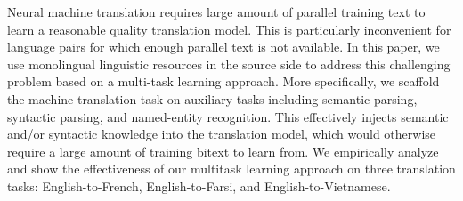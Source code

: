 Neural machine translation requires large amount of parallel training text to learn a reasonable quality translation model. This is particularly inconvenient for language pairs for which enough parallel text is not available. In this paper, we use monolingual linguistic resources in the source side to address this challenging problem based on a multi-task learning approach. More specifically, we scaffold the machine translation task on auxiliary tasks including  semantic parsing, syntactic parsing, and named-entity recognition. This effectively injects  semantic and/or syntactic knowledge into the translation model, which would otherwise require a large amount of training bitext to learn from. We empirically analyze and show the effectiveness of our multitask learning approach on three translation tasks: English-to-French, English-to-Farsi, and English-to-Vietnamese.
